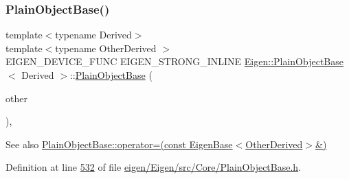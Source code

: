 \mbox{\label{class_eigen_1_1_plain_object_base_a82cdb1b9d5c90c2002cb5086c03c29fa}} 
\subsubsection{\texorpdfstring{Plain\+Object\+Base()}{PlainObjectBase()}\hspace{0.1cm}{\footnotesize\ttfamily [2/6]}}
{\footnotesize\ttfamily template$<$typename Derived$>$ \\
template$<$typename Other\+Derived $>$ \\
E\+I\+G\+E\+N\+\_\+\+D\+E\+V\+I\+C\+E\+\_\+\+F\+U\+NC E\+I\+G\+E\+N\+\_\+\+S\+T\+R\+O\+N\+G\+\_\+\+I\+N\+L\+I\+NE \hyperlink{class_eigen_1_1_plain_object_base}{Eigen\+::\+Plain\+Object\+Base}$<$ Derived $>$\+::\hyperlink{class_eigen_1_1_plain_object_base}{Plain\+Object\+Base} (\begin{DoxyParamCaption}\item[{const \hyperlink{group___core___module_class_eigen_1_1_dense_base}{Dense\+Base}$<$ Other\+Derived $>$ \&}]{other }\end{DoxyParamCaption})\hspace{0.3cm}{\ttfamily [inline]}, {\ttfamily [protected]}}

\begin{DoxySeeAlso}{See also}
\hyperlink{class_eigen_1_1_plain_object_base_a6d280056e43429f043e8b25262ee6153}{Plain\+Object\+Base\+::operator=(const Eigen\+Base$<$\+Other\+Derived$>$\&)} 
\end{DoxySeeAlso}


Definition at line \hyperlink{eigen_2_eigen_2src_2_core_2_plain_object_base_8h_source_l00532}{532} of file \hyperlink{eigen_2_eigen_2src_2_core_2_plain_object_base_8h_source}{eigen/\+Eigen/src/\+Core/\+Plain\+Object\+Base.\+h}.

\mbox{\label{class_eigen_1_1_plain_object_base_a31d65efdbeaf9c7693bf6ae204d788f2}} 
